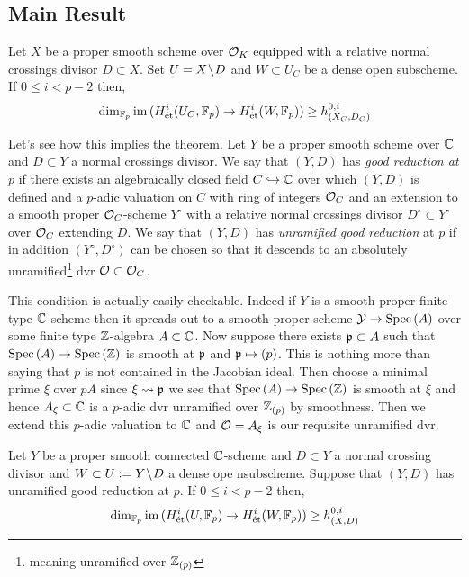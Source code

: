 \documentclass[12pt]{article}
\begin{document}
\subsection{Main Result}

\begin{prop} \label{main_prop}
Let $X$ be a proper smooth scheme over $\mathcal{O}_K$ equipped with a relative normal crossings divisor $D \subset X$. Set $U = X \! \setminus \! D$ and $W \subset U_C$ be a dense open subscheme. If $0 \le i < p -2$ then,
\[ \dim_{\mathbb{F}_p} \operatorname{\mathrm{im}}{(H^i_{\text{\'{e}t}}(U_C, \mathbb{F}_p) \to H^i_{\text{\'{e}t}}(W, \mathbb{F}_p))} \ge h^{0,i}_{(X_C, D_C)} \]
\end{prop}
\bigskip
Let's see how this implies the theorem. Let $Y$ be a proper smooth scheme over $\mathbb{C}$ and $D \subset Y$ a normal crossings divisor. We say that $(Y, D)$ has \textit{good reduction at} $p$ if there exists an algebraically closed field $C \hookrightarrow \mathbb{C}$ over which $(Y, D)$ is defined and a $p$-adic valuation on $C$ with ring of integers $\mathcal{O}_C$ and an extension to a smooth proper $\mathcal{O}_C$-scheme $Y^\circ$ with a relative normal crossings divisor $D^\circ \subset Y^\circ$ over $\mathcal{O}_C$ extending $D$. We say that $(Y, D)$ has \textit{unramified good reduction} at $p$ if in addition $(Y^\circ, D^\circ)$ can be chosen so that it descends to an absolutely unramified\footnote{meaning unramified over $\mathbb{Z}_{(p)}$} dvr $\mathcal{O} \subset \mathcal{O}_C$. 

\begin{rmk}
This condition is actually easily checkable. Indeed if $Y$ is a smooth proper finite type $\mathbb{C}$-scheme then it spreads out to a smooth proper scheme $\mathcal{Y} \to \mathrm{Spec}\left( A \right)$ over some finite type $\mathbb{Z}$-algebra $A \subset \mathbb{C}$. Now suppose there exists $\mathfrak{p} \subset A$ such that $\mathrm{Spec}\left( A \right) \to \mathrm{Spec}\left( \mathbb{Z} \right)$ is smooth at $\mathfrak{p}$ and $\mathfrak{p} \mapsto (p)$. This is nothing more than saying that $p$ is not contained in the Jacobian ideal. Then choose a minimal prime $\xi$ over $p A$ since $\xi \rightsquigarrow \mathfrak{p}$ we see that $\mathrm{Spec}\left( A \right) \to \mathrm{Spec}\left( \mathbb{Z} \right)$ is smooth at $\xi$ and hence $A_{\xi} \subset \mathbb{C}$ is a $p$-adic dvr unramified over $\mathbb{Z}_{(p)}$ by smoothness. Then we extend this $p$-adic valuation to $\mathbb{C}$ and $\mathcal{O} = A_{\xi}$ is our requisite unramified dvr. 
\end{rmk}

\begin{cor}
Let $Y$ be a proper smooth connected $\mathbb{C}$-scheme and $D \subset Y$ a normal crossing divisor and $W \subset U := Y \! \setminus \! D$ a dense ope nsubscheme. Suppose that $(Y, D)$ has unramified good reduction at $p$. If $0 \le i < p - 2$ then,
\[ \dim_{\mathbb{F}_p} \operatorname{\mathrm{im}}{(H^i_{\text{\'{e}t}}(U, \mathbb{F}_p) \to H^i_{\text{\'{e}t}}(W, \mathbb{F}_p))} \ge h^{0,i}_{(X, D)} \]
\end{cor}
\end{document}

